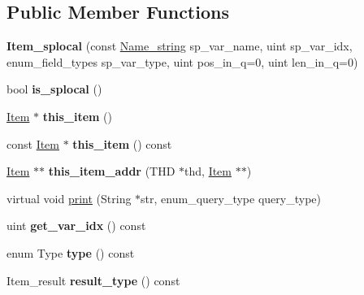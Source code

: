 \subsection*{Public Member Functions}
\begin{DoxyCompactItemize}
\item 
\mbox{\label{classItem__splocal_ac17dd99e707076826e100a76aea26385}} 
{\bfseries Item\+\_\+splocal} (const \mbox{\hyperlink{className__string}{Name\+\_\+string}} sp\+\_\+var\+\_\+name, uint sp\+\_\+var\+\_\+idx, enum\+\_\+field\+\_\+types sp\+\_\+var\+\_\+type, uint pos\+\_\+in\+\_\+q=0, uint len\+\_\+in\+\_\+q=0)
\item 
\mbox{\label{classItem__splocal_a55f67fd3e64ed6a5d3934377052344eb}} 
bool {\bfseries is\+\_\+splocal} ()
\item 
\mbox{\label{classItem__splocal_afe8500a67035e55b044ecfb1978927d7}} 
\mbox{\hyperlink{classItem}{Item}} $\ast$ {\bfseries this\+\_\+item} ()
\item 
\mbox{\label{classItem__splocal_ae2605c320cfddce9eef85a9a470c159c}} 
const \mbox{\hyperlink{classItem}{Item}} $\ast$ {\bfseries this\+\_\+item} () const
\item 
\mbox{\label{classItem__splocal_ae89433b0fc74172f8f542f35473872b6}} 
\mbox{\hyperlink{classItem}{Item}} $\ast$$\ast$ {\bfseries this\+\_\+item\+\_\+addr} (T\+HD $\ast$thd, \mbox{\hyperlink{classItem}{Item}} $\ast$$\ast$)
\item 
virtual void \mbox{\hyperlink{classItem__splocal_a29ba8bcb74a30bdaf98fe72fdc28b543}{print}} (String $\ast$str, enum\+\_\+query\+\_\+type query\+\_\+type)
\item 
\mbox{\label{classItem__splocal_a40c536ee35013b584cc8cde158da5fb2}} 
uint {\bfseries get\+\_\+var\+\_\+idx} () const
\item 
\mbox{\label{classItem__splocal_a4e82e449793413b7f52f760f11108bb3}} 
enum Type {\bfseries type} () const
\item 
\mbox{\label{classItem__splocal_af9b19daf7020bf55588d465820000942}} 
Item\+\_\+result {\bfseries result\+\_\+type} () const

\end{DoxyCompactItemize}
